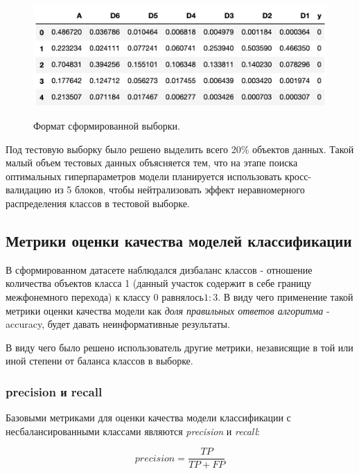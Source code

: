 \documentclass[utf8x, 14pt, oneside, a4paper]{article}
\begin{document}
	\begin{figure}[h!]
		\begin{center}
			{\includegraphics[scale = 0.6]{img/head.png}}
		\end{center}
		\caption{Формат сформированной выборки.}
		\label{ris:head}
	\end{figure}

	Под тестовую выборку было решено выделить всего 20\% объектов данных. Такой малый объем тестовых данных объясняется тем, что на этапе поиска оптимальных гиперпараметров модели планируется использовать кросс-валидацию \cite{cross-val} из 5 блоков, чтобы нейтрализовать эффект неравномерного распределения классов в тестовой выборке.
	
	\subsection{Метрики оценки качества моделей классификации}
	
	В сформированном датасете наблюдался дизбаланс классов - отношение количества объектов класса 1 (данный участок содержит в себе границу межфонемного перехода) к классу 0 равнялось$1:3$. В виду чего применение такой метрики оценки качества модели как \textit{доля правильных ответов алгоритма} - accuracy, будет давать неинформативные результаты.
	
	В виду чего было решено использователь другие метрики, независящие в той или иной степени от баланса классов в выборке.
	
	\subsubsection{precision и recall}
	
	Базовыми метриками для оценки качества модели классификации с несбалансированными классами являются \textit{precision} и \textit{recall}:
	
	\begin{equation}
		precision = \frac{TP}{TP+FP}
	\end{equation}
\end{document}
